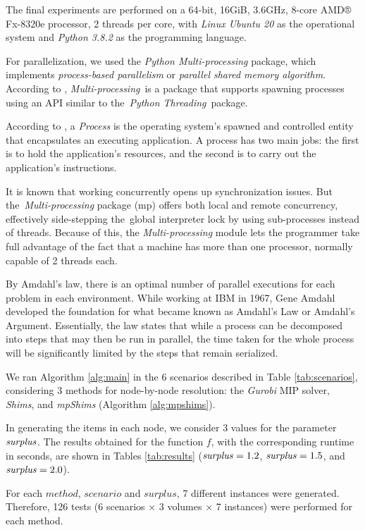 \documentclass[preprint,authoryear]{elsarticle}
\begin{document}
The final experiments are performed on a 64-bit, 16GiB, 3.6GHz, 8-core AMD® Fx-8320e processor, 2 threads per core, with {\it Linux Ubuntu 20} as the operational system and {\it Python 3.8.2} as the programming language.

For parallelization, we used the {\it Python Multi-processing} package, which implements {\it process-based parallelism} or {\it parallel shared memory algorithm}. According to \cite{multiprocessing}, {\it Multi-processing} is a package that supports spawning processes using an API similar to the {\it Python Threading} package.

According to \cite[p.271]{Breshears2009}, a {\it Process} is the operating system’s spawned and controlled entity that encapsulates an executing application. A process has two main jobs: the first is to hold the application's resources, and the second is to carry out the application's instructions. 

It is known that working concurrently opens up synchronization issues. But the {\it Multi-processing} package (mp) offers both local and remote concurrency, effectively side-stepping the global interpreter lock by using sub-processes instead of threads. Because of this, the {\it Multi-processing} module lets the programmer take full advantage of the fact that a machine has more than one processor, normally capable of 2 threads each.

By Amdahl's law, there is an optimal number of parallel executions for each problem in each environment. While working at IBM in 1967, Gene Amdahl developed the foundation for what became known as Amdahl's Law or Amdahl's Argument. Essentially, the law states that while a process can be decomposed into steps that may then be run in parallel, the time taken for the whole process will be significantly limited by the steps that remain serialized.

We ran Algorithm \ref{alg:main} in the 6 scenarios described in Table \ref{tab:scenarios}, considering 3 methods for node-by-node resolution: the {\it Gurobi} MIP solver, {\it Shims}, and {\it mpShims} (Algorithm \ref{alg:mpshims}).

In generating the items in each node, we consider 3 values for the parameter ${\it surplus}$. The results obtained for the function $f$, with the corresponding runtime in seconds, are shown in Tables \ref{tab:results} (${\it surplus} = 1.2$, ${\it surplus} = 1.5$, and ${\it surplus} = 2.0$).

For each $method$, $scenario$ and $surplus$, 7 different instances were generated. Therefore, 126 tests (6 scenarios $\times$ 3 volumes $\times$ 7 instances) were performed for each method. 
\end{document}
